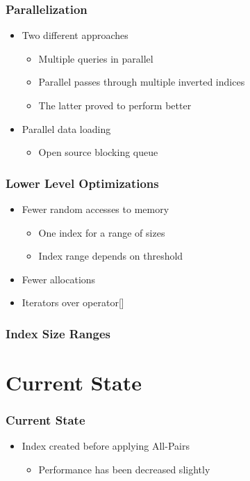 \documentclass{beamer}
\begin{document}
    \begin{frame}
        \frametitle{Parallelization}
        \begin{itemize}
            \item Two different approaches
                \begin{itemize}
                    \item Multiple queries in parallel
                    \item Parallel passes through multiple inverted indices
                    \item The latter proved to perform better
                \end{itemize}
            \item Parallel data loading
                \begin{itemize}
                    \item Open source blocking queue
                \end{itemize}
        \end{itemize}
    \end{frame}

    \begin{frame}
        \frametitle{Lower Level Optimizations}
        \begin{itemize}
            \item Fewer random accesses to memory
                \begin{itemize}
                    \item One index for a range of sizes
                    \item Index range depends on threshold
                \end{itemize}
            \item Fewer allocations
            \item Iterators over operator[]
        \end{itemize}
    \end{frame}

    \begin{frame}
        \frametitle{Index Size Ranges}
        
    \end{frame}

    \section{Current State}

    \begin{frame}
        \frametitle{Current State}
        \begin{itemize}
            \item Index created before applying All-Pairs
                \begin{itemize}
                    \item Performance has been decreased slightly
                \end{itemize}
        \end{itemize}
    \end{frame}
\end{document}
